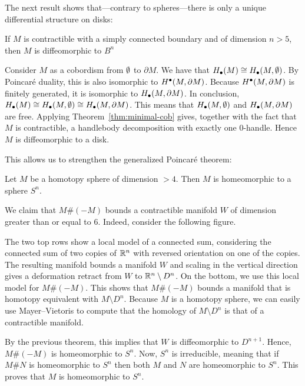 The next result shows that---contrary to spheres---there is only a unique differential structure on disks:
\begin{theorem}
    If $M$ is contractible with a simply connected boundary and of dimension $n >  5$, then $M$ is diffeomorphic to $B^{n}$
\end{theorem}
\begin{myproof}
    Consider $M$ as a cobordism from  $\emptyset$ to  $\partial M$.
    We have that  $H_\bullet(M) \cong H_\bullet(M, \emptyset)$.
    By Poincaré duality, this is also isomorphic to  $H^\bullet(M, \partial M)$.
    Because  $H^{\bullet}(M, \partial M)$ is finitely generated, it is isomorphic to $H_\bullet(M, \partial M)$.
    In conclusion, $H_\bullet(M) \cong H_\bullet(M, \emptyset) \cong H_\bullet(M, \partial M)$.
    This means that $H_\bullet(M, \emptyset)$ and  $H_\bullet(M, \partial M)$ are free.
    Applying Theorem~\ref{thm:minimal-cob} gives, together with the fact that $M$ is contractible, a handlebody decomposition with exactly one $0$-handle.
    Hence $M$ is diffeomorphic to a disk.
\end{myproof}

\filbreak
This allows us to strengthen the generalized Poincaré theorem:
\begin{theorem}
    Let $M$ be a homotopy sphere of dimension  $> 4$. Then $M$ is homeomorphic to a sphere $S^{n}$.
\end{theorem}
\begin{myproof}
    We claim that $M \# (-M)$ bounds a contractible manifold $W$ of dimension greater than or equal to $6$.
    Indeed, consider the following figure.
\begin{figure}[H]
    \centering
    \label{fig:connected-sum-homotopy-spheres}
\end{figure}
The two top rows show a local model of a connected sum, considering the connected sum of two copies of $\mathbb{R}^{n}$ with reversed orientation on one of the copies.
The resulting manifold bounds a manifold $W$ and scaling in the vertical direction gives a deformation retract from $W$ to  $ \mathbb{R}^{n} \setminus D^{n}$.
On the bottom, we use this local model for $ M \# (-M)$. This shows that $M \#(-M)$ bounds a manifold that is homotopy equivalent with  $M \setminus D^{n}$.
Because $M$ is a homotopy sphere, we can easily use Mayer--Vietoris to compute that the homology of $M \setminus D^{n}$ is that of a contractible manifold.

By the previous theorem, this implies that $W$ is diffeomorphic to $D^{n+1}$.
Hence, $M \#(-M)$ is homeomorphic to $S^{n}$.
Now, $S^{n}$ is irreducible, meaning that if $M \# N$ is homeomorphic to  $S^{n}$ then both $M$ and $N$ are homeomorphic to $S^{n}$.
This proves that $M$ is homeomorphic to  $S^{n}$.
\end{myproof}

